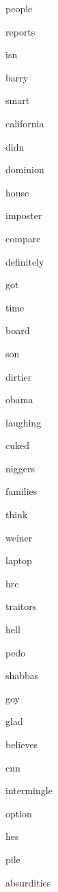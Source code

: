\documentclass[varwidth]{standalone}
\begin{document}
\begin{CJK*}{UTF8}{gbsn}
{{{\colorbox{red!9.187929153442383}{\strut people}
\colorbox{red!9.288948059082031}{\strut reports}
\colorbox{red!14.692319869995117}{\strut isn}
\colorbox{red!15.03701400756836}{\strut barry}
\colorbox{red!1.517460823059082}{\strut smart}
\colorbox{red!15.059438705444336}{\strut california}
\colorbox{red!9.151466369628906}{\strut didn}
\colorbox{red!15.659805297851562}{\strut dominion}
\colorbox{red!15.03805160522461}{\strut house}
\colorbox{red!15.14924430847168}{\strut imposter}
\colorbox{red!12.77144718170166}{\strut compare}
\colorbox{red!12.904401779174805}{\strut definitely}
\colorbox{red!15.116107940673828}{\strut got}
\colorbox{red!13.860268592834473}{\strut time}
\colorbox{red!10.861883163452148}{\strut board}
\colorbox{red!12.781351089477539}{\strut son}
\colorbox{red!11.365269660949707}{\strut dirtier}
\colorbox{red!13.308363914489746}{\strut obama}
\colorbox{red!5.649962902069092}{\strut laughing}
\colorbox{red!14.609533309936523}{\strut cuked}
\colorbox{red!15.176536560058594}{\strut niggers}
\colorbox{red!11.670202255249023}{\strut families}
\colorbox{red!12.876423835754395}{\strut think}
\colorbox{red!13.579582214355469}{\strut weiner}
\colorbox{red!9.440067291259766}{\strut laptop}
\colorbox{red!15.221963882446289}{\strut hrc}
\colorbox{red!13.505075454711914}{\strut traitors}
\colorbox{red!8.524103164672852}{\strut hell}
\colorbox{red!15.807948112487793}{\strut pedo}
\colorbox{red!11.092727661132812}{\strut shabbas}
\colorbox{red!14.19754409790039}{\strut goy}
\colorbox{red!9.511869430541992}{\strut glad}
\colorbox{red!9.964937210083008}{\strut believes}
\colorbox{red!13.856590270996094}{\strut cnn}
\colorbox{red!15.411253929138184}{\strut intermingle}
\colorbox{red!11.347124099731445}{\strut option}
\colorbox{red!13.938141822814941}{\strut hes}
\colorbox{red!10.129107475280762}{\strut pile}
\colorbox{red!13.313011169433594}{\strut absurdities}

}}}
\end{CJK*}
\end{document}
